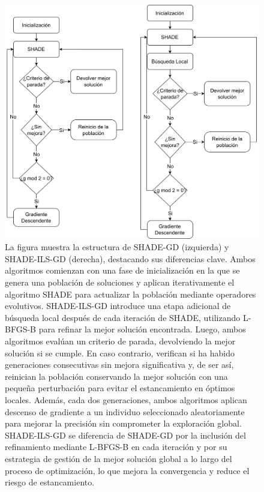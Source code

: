 \begin{figure}
    \centering
    \includegraphics[width=1.0\linewidth]{Plantilla_TFG_latex//imagenes//Inf//Propias/SHADE-GD.png}
    \caption[Diagramas de flujo de los algoritmos SHADE-GD y SHADE-ILS-GD]{La figura muestra la estructura de SHADE-GD (izquierda) y SHADE-ILS-GD (derecha), destacando sus diferencias clave. Ambos algoritmos comienzan con una fase de inicialización en la que se genera una población de soluciones y aplican iterativamente el algoritmo SHADE para actualizar la población mediante operadores evolutivos. SHADE-ILS-GD introduce una etapa adicional de búsqueda local después de cada iteración de SHADE, utilizando L-BFGS-B para refinar la mejor solución encontrada. Luego, ambos algoritmos evalúan un criterio de parada, devolviendo la mejor solución si se cumple. En caso contrario, verifican si ha habido generaciones consecutivas sin mejora significativa y, de ser así, reinician la población conservando la mejor solución con una pequeña perturbación para evitar el estancamiento en óptimos locales. Además, cada dos generaciones, ambos algoritmos aplican descenso de gradiente a un individuo seleccionado aleatoriamente para mejorar la precisión sin comprometer la exploración global. SHADE-ILS-GD se diferencia de SHADE-GD por la inclusión del refinamiento mediante L-BFGS-B en cada iteración y por su estrategia de gestión de la mejor solución global a lo largo del proceso de optimización, lo que mejora la convergencia y reduce el riesgo de estancamiento.}
    \label{fig:flowchart}
\end{figure}

